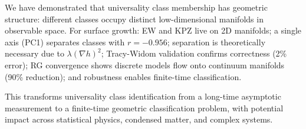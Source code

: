 \documentclass[aps,prl,twocolumn,superscriptaddress,showpacs]{revtex4-2}
\begin{document}
We have demonstrated that universality class membership has geometric structure: different classes occupy distinct low-dimensional manifolds in observable space. For surface growth: EW and KPZ live on 2D manifolds; a single axis (PC1) separates classes with $r = -0.956$; separation is theoretically necessary due to $\lambda(\nabla h)^2$; Tracy-Widom validation confirms correctness (2\% error); RG convergence shows discrete models flow onto continuum manifolds (90\% reduction); and robustness enables finite-time classification.

This transforms universality class identification from a long-time asymptotic measurement to a finite-time geometric classification problem, with potential impact across statistical physics, condensed matter, and complex systems.

\begin{acknowledgments}
[To be added]
\end{acknowledgments}


\end{document}
